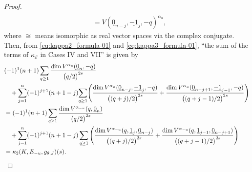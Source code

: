 \documentclass[10pt,a4paper]{amsart}
\numberwithin{equation}{section}
\newcommand{\cE}{\mathcal{E}}
\begin{document}
\begin{proof}
\begin{align*}
 \\
 & = V ( \underline{0}_{n-j} , \underline{-1}_{j} , -q )^{\alpha_{u}}
 ,
 \end{align*}
 where $\cong$ means isomorphic as real vector spaces via the complex conjugate.
 Then, from \eqref{eq:kappa2_formula-01} and
 \eqref{eq:kappa3_formula-01},
 ``the sum of the terms of $\kappa_{\cE}$ in Cases IV and VII''
 is given by
 \begin{align*}
 &
 (-1 )^{1} (n+1)
 \sum_{q \geq 1 }
 \frac{
 \dim V^{\alpha_u} ( \underline{0}_{n}, -q )
 }{
 \bigl( q /2 \bigr)^{2s}
 }
 \notag
 \\
 & \quad +
 \sum_{j=1}^{n}
 (-1 )^{j+1} (n+1-j)\!
 \sum_{q \geq 1 }\!
 \left(
 \frac{
 \dim V^{\alpha_u} ( \underline{0}_{n-j}, \underline{-1}_{j} , -q )
 }{
 \bigl( ( q+j)/2 \bigr)^{2s}
 }
 +
 \frac{
 \dim V^{\alpha_u} ( \underline{0}_{n-j+1}, \underline{-1}_{j-1} , -q )
 }{
 \bigl( (q+j-1)/2 \bigr)^{2s}
 }
 \right)
 \notag
 \\
 & =
 (-1 )^{1} (n+1)
 \sum_{q \geq 1 }
 \frac{
 \dim V^{\alpha_{-u}} ( q, \underline{0}_{n} )
 }{
 \bigl( q /2 \bigr)^{2s}
 }
 \notag
 \\
 & \quad +
 \sum_{j=1}^{n}
 (-1 )^{j+1} (n+1-j)
 \sum_{q \geq 1 }
 \left(
 \frac{
 \dim V^{\alpha_{-u}} ( q, \underline{1}_{j} ,\underline{0}_{n-j} )
 }{
 \bigl( ( q+j)/2 \bigr)^{2s}
 }
 +
 \frac{
 \dim V^{\alpha_{-u}} ( q, \underline{1}_{j-1} ,\underline{0}_{n-j+1} )
 }{
 \bigl( (q+j-1)/2 \bigr)^{2s}
 }
 \right)
 \notag
 \\
 & =
 \kappa_{2} (K, E_{-u} , g_{\theta , J} ) (s).
 \tag*{\qed}
 \end{align*}
\renewcommand{\qed}{}
\end{proof}
\end{document}
